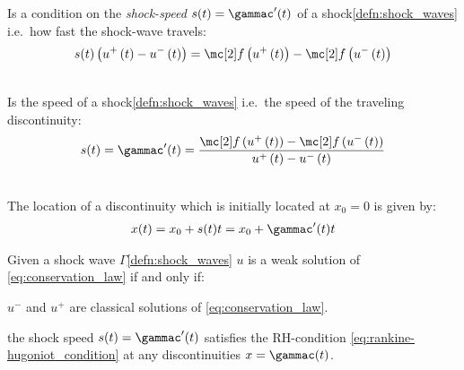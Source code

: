 \begin{defnbox}\nospacing
    \begin{defn}\label{defn:rankine-hugoniot_condition}
        Is a condition on the \textit{shock-speed} $s(t)=\gammac'(t)$ of a shock\cref{defn:shock_waves} i.e.\ how fast the shock-wave travels:
        \begin{align}
          s(t)\left(u^{+}\left(t\right)-u^{-}\left(t\right)\right)=\flux\left(u^{+}\left(t\right)\right)-\flux\left(u^{-}\left(t\right)\right) \label{eq:rankine-hugoniot_condition}
        \end{align}
    \end{defn}
\end{defnbox}
\begin{corbox}\nospacing
    \begin{cor}\label{cor:shock_speed}\leavevmode\\
        Is the speed of a shock\cref{defn:shock_waves} i.e.\ the speed of the traveling discontinuity:
        \begin{align}
          s(t)=\gammac'(t)=
          \frac{\flux\left(u^{+}\left(t\right)\right)-\flux\left(u^{-}\left(t\right)\right)}{u^{+}\left(t\right)-u^{-}\left(t\right)}\label{eq:shock_speed}
        \end{align}
    \end{cor}
\end{corbox}
\begin{explanationbox}\nospacing
    \begin{explanation}\leavevmode\\
       The location of a discontinuity which is initially located at $x_{0}=0$ is given by:
       \begin{align*}
         x(t)=x_{0}+s(t)t=x_{0}+\gammac'(t)t
       \end{align*}
    \end{explanation}
\end{explanationbox}
\begin{theorembox}\nospacing
    \begin{theorem}\label{theorem:weak_solution}
        Given a shock wave $\Gamma$\cref{defn:shock_waves} $u$ is a weak solution of \cref{eq:conservation_law} if and only if:
        \begin{circlelistnosep}
            \item $u^{-}$ and $u^{+}$ are classical solutions of \cref{eq:conservation_law}.
            \item the shock speed $s(t)=\gammac'(t)$ satisfies the RH-condition \cref{eq:rankine-hugoniot_condition} at
            any discontinuities $x=\gammac(t)$.
        \end{circlelistnosep}
    \end{theorem}
\end{theorembox}
